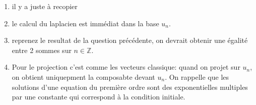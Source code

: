 \documentclass[11pt,a4paper]{article}
\numberwithin{equation}{section}
\theoremstyle{plain}
\theoremstyle{definition}
\theoremstyle{remark}
\newcommand{\Z}{\mathbb{Z}}
\begin{document}
\begin{indication}
    \begin{enumerate}[label=\alph*)]
        \item il y a juste à recopier
        \item le calcul du laplacien est immédiat dans la base $u_n$.
        \item reprenez le resultat de la question précédente, on devrait obtenir une égalité entre 2 sommes sur $n \in \Z$.
        \item Pour le projection c'est comme les vecteurs classique: quand on projet sur $u_n$, on obtient uniquepment la composabte devant $u_n$.
              On rappelle que les solutions d'une equation du première ordre sont des exponentielles multiples par une constante qui correspond à la condition initiale.
    \end{enumerate}
\end{indication}
\end{document}
